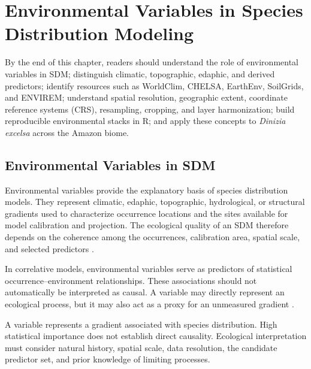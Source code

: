 \chapter[Environmental Variables]{Environmental Variables in Species Distribution Modeling}

\begin{objetivos}
By the end of this chapter, readers should understand the role of environmental
variables in SDM; distinguish climatic, topographic, edaphic, and derived
predictors; identify resources such as WorldClim, CHELSA, EarthEnv, SoilGrids,
and ENVIREM; understand spatial resolution, geographic extent, coordinate
reference systems (CRS), resampling, cropping, and layer harmonization; build
reproducible environmental stacks in R; and apply these concepts to
\textit{Dinizia excelsa} across the Amazon biome.
\end{objetivos}

\section{Environmental Variables in SDM}

Environmental variables provide the explanatory basis of species distribution
models. They represent climatic, edaphic, topographic, hydrological, or
structural gradients used to characterize occurrence locations and the sites
available for model calibration and projection. The ecological quality of an
SDM therefore depends on the coherence among the occurrences, calibration area,
spatial scale, and selected predictors
\parencite{guisan2005predicting,elith2009,guisan2017habitat}.

In correlative models, environmental variables serve as predictors of
statistical occurrence--environment relationships. These associations should
not automatically be interpreted as causal. A variable may directly represent
an ecological process, but it may also act as a proxy for an unmeasured gradient
\parencite{franklin2010,guisan2017habitat}.

\begin{conceito}[title={\faBook\quad An environmental variable is not necessarily an ecological mechanism}]
A variable represents a gradient associated with species distribution. High
statistical importance does not establish direct causality. Ecological
interpretation must consider natural history, spatial scale, data resolution,
the candidate predictor set, and prior knowledge of limiting processes.
\end{conceito}

